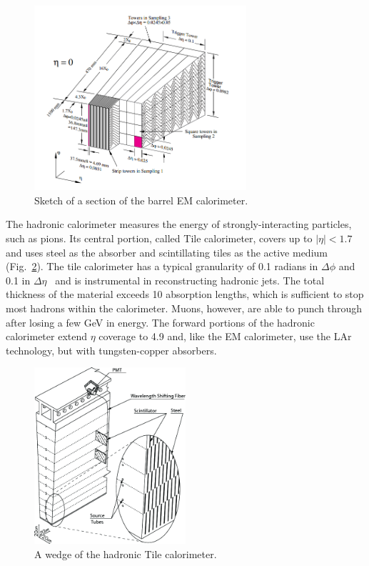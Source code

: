 \begin{figure}[phtb]
  \begin{center}
    \includegraphics[width=0.70\textwidth]{det/fig/accordion}
    \caption{ Sketch of a section of the barrel EM calorimeter. }
    \label{fig:det:accordion}
  \end{center}
\end{figure}

The hadronic calorimeter measures the energy of strongly-interacting particles, such as pions. Its central portion, called Tile calorimeter, covers up to $|\eta|<1.7$ and uses steel as the absorber and scintillating tiles as the active medium (Fig.~\ref{fig:det:tile}). The tile calorimeter has a typical granularity of 0.1 radians in $\Delta\phi$ and 0.1 in $\Delta\eta$~\cite{tile_tdr} and is instrumental in reconstructing hadronic jets. The total thickness of the material exceeds 10 absorption lengths, which is sufficient to stop most hadrons within the calorimeter. Muons, however, are able to punch through after losing a few GeV in energy. The forward portions of the hadronic calorimeter extend $\eta$ coverage to 4.9 and, like the EM calorimeter, use the LAr technology, but with tungsten-copper absorbers.

\begin{figure}[phtb]
  \begin{center}
    \includegraphics[width=0.50\textwidth]{det/fig/tile}
    \caption{ A wedge of the hadronic Tile calorimeter. }
    \label{fig:det:tile}
  \end{center}
\end{figure}

